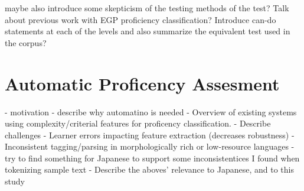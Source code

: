 maybe also introduce some skepticism of the testing methods of the test?
Talk about previous work with EGP proficiency classification?
Introduce can-do statements at each of the levels and also summarize the equivalent test used in the corpus?


\section{Automatic Proficency Assesment}
- motivation - describe why automatino is needed
- Overview of existing systems using complexity/criterial features for proficency classification.
- Describe challenges
    - Learner errors impacting feature extraction (decreases robustness)
    -Inconsistent tagging/parsing in morphologically rich or low-resource languages
        -try to find something for Japanese to support some inconsistentices I found when tokenizing sample text
- Describe the aboves' relevance to Japanese, and to this study



